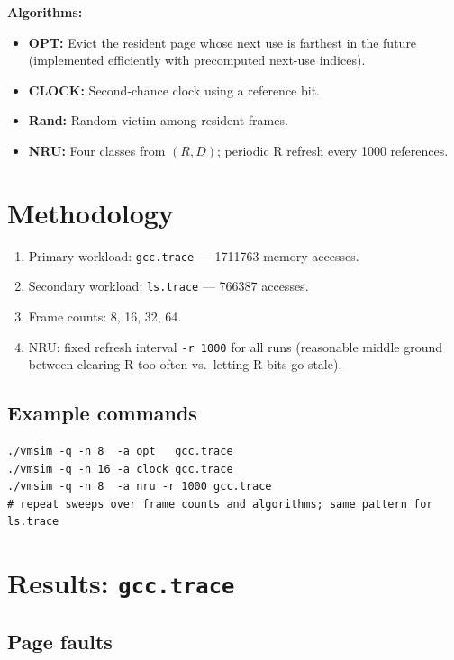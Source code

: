 \documentclass[11pt]{article}
\begin{document}
\noindent\textbf{Algorithms:}
\begin{itemize}
  \item \textbf{OPT:} Evict the resident page whose next use is farthest in the future (implemented efficiently with precomputed next-use indices).
  \item \textbf{CLOCK:} Second-chance clock using a reference bit.
  \item \textbf{Rand:} Random victim among resident frames.
  \item \textbf{NRU:} Four classes from $(R,D)$; periodic R refresh every \num{1000} references.
\end{itemize}

\section{Methodology}

\begin{enumerate}
  \item Primary workload: \texttt{gcc.trace} --- \num{1711763} memory accesses.
  \item Secondary workload: \texttt{ls.trace} --- \num{766387} accesses.
  \item Frame counts: \num{8}, \num{16}, \num{32}, \num{64}.
  \item NRU: fixed refresh interval \texttt{-r 1000} for all runs (reasonable middle ground between clearing R too often vs.\ letting R bits go stale).
\end{enumerate}

\subsection*{Example commands}

\begin{lstlisting}
./vmsim -q -n 8  -a opt   gcc.trace
./vmsim -q -n 16 -a clock gcc.trace
./vmsim -q -n 8  -a nru -r 1000 gcc.trace
# repeat sweeps over frame counts and algorithms; same pattern for ls.trace
\end{lstlisting}

\section{Results: \texttt{gcc.trace}}

\subsection{Page faults}
\end{document}
